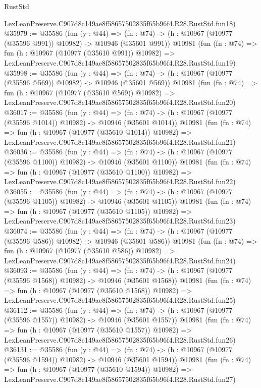\begin{lexlean}{RustStd}
\begin{coremodule}
    LexLeanPreserve.C907d8c149ae8f58657502835f65b96f4.R28.RustStd.fun18)
@35979 := @35586
    (fun (y : @44) =>
    (fn : @74) -> (h : @10967 (@10977 (@35596 @991)) @10982) -> @10946 (@35601 @991))
    @10981
    (fun (fn : @74) =>
    fun (h : @10967 (@10977 (@35610 @991)) @10982) =>
    LexLeanPreserve.C907d8c149ae8f58657502835f65b96f4.R28.RustStd.fun19)
@35998 := @35586
    (fun (y : @44) =>
    (fn : @74) -> (h : @10967 (@10977 (@35596 @569)) @10982) -> @10946 (@35601 @569))
    @10981
    (fun (fn : @74) =>
    fun (h : @10967 (@10977 (@35610 @569)) @10982) =>
    LexLeanPreserve.C907d8c149ae8f58657502835f65b96f4.R28.RustStd.fun20)
@36017 := @35586
    (fun (y : @44) =>
    (fn : @74) -> (h : @10967 (@10977 (@35596 @1014)) @10982) -> @10946 (@35601 @1014))
    @10981
    (fun (fn : @74) =>
    fun (h : @10967 (@10977 (@35610 @1014)) @10982) =>
    LexLeanPreserve.C907d8c149ae8f58657502835f65b96f4.R28.RustStd.fun21)
@36036 := @35586
    (fun (y : @44) =>
    (fn : @74) -> (h : @10967 (@10977 (@35596 @1100)) @10982) -> @10946 (@35601 @1100))
    @10981
    (fun (fn : @74) =>
    fun (h : @10967 (@10977 (@35610 @1100)) @10982) =>
    LexLeanPreserve.C907d8c149ae8f58657502835f65b96f4.R28.RustStd.fun22)
@36055 := @35586
    (fun (y : @44) =>
    (fn : @74) -> (h : @10967 (@10977 (@35596 @1105)) @10982) -> @10946 (@35601 @1105))
    @10981
    (fun (fn : @74) =>
    fun (h : @10967 (@10977 (@35610 @1105)) @10982) =>
    LexLeanPreserve.C907d8c149ae8f58657502835f65b96f4.R28.RustStd.fun23)
@36074 := @35586
    (fun (y : @44) =>
    (fn : @74) -> (h : @10967 (@10977 (@35596 @586)) @10982) -> @10946 (@35601 @586))
    @10981
    (fun (fn : @74) =>
    fun (h : @10967 (@10977 (@35610 @586)) @10982) =>
    LexLeanPreserve.C907d8c149ae8f58657502835f65b96f4.R28.RustStd.fun24)
@36093 := @35586
    (fun (y : @44) =>
    (fn : @74) -> (h : @10967 (@10977 (@35596 @1568)) @10982) -> @10946 (@35601 @1568))
    @10981
    (fun (fn : @74) =>
    fun (h : @10967 (@10977 (@35610 @1568)) @10982) =>
    LexLeanPreserve.C907d8c149ae8f58657502835f65b96f4.R28.RustStd.fun25)
@36112 := @35586
    (fun (y : @44) =>
    (fn : @74) -> (h : @10967 (@10977 (@35596 @1557)) @10982) -> @10946 (@35601 @1557))
    @10981
    (fun (fn : @74) =>
    fun (h : @10967 (@10977 (@35610 @1557)) @10982) =>
    LexLeanPreserve.C907d8c149ae8f58657502835f65b96f4.R28.RustStd.fun26)
@36131 := @35586
    (fun (y : @44) =>
    (fn : @74) -> (h : @10967 (@10977 (@35596 @1594)) @10982) -> @10946 (@35601 @1594))
    @10981
    (fun (fn : @74) =>
    fun (h : @10967 (@10977 (@35610 @1594)) @10982) =>
    LexLeanPreserve.C907d8c149ae8f58657502835f65b96f4.R28.RustStd.fun27)

\end{coremodule}
\end{lexlean}
